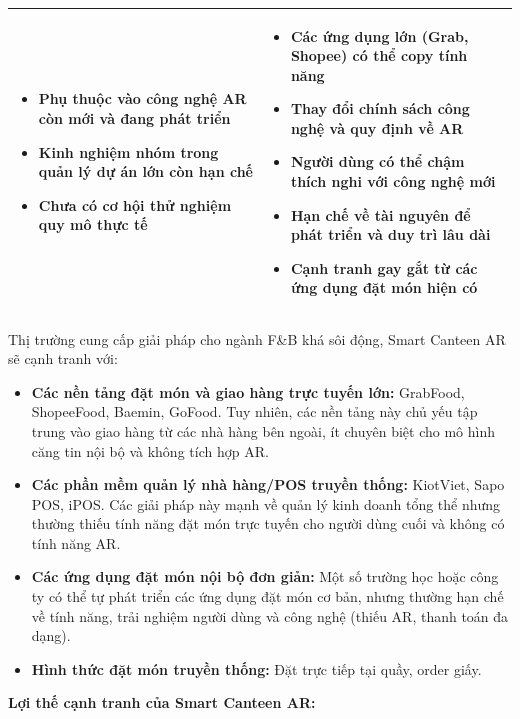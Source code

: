 \documentclass[12pt,a4paper]{article}
\begin{document}
\begin{table}[H]
\begin{tabular}{@{}>{\raggedright\arraybackslash}p{7cm}>{\raggedright\arraybackslash}p{7cm}@{}}
\begin{itemize}[leftmargin=0.4cm,topsep=0pt,itemsep=2pt,parsep=0pt]
    \item Phụ thuộc vào công nghệ AR còn mới và đang phát triển
    \item Kinh nghiệm nhóm trong quản lý dự án lớn còn hạn chế
    \item Chưa có cơ hội thử nghiệm quy mô thực tế
\end{itemize} &
\begin{itemize}[leftmargin=0.4cm,topsep=0pt,itemsep=2pt,parsep=0pt]
    \item Các ứng dụng lớn (Grab, Shopee) có thể copy tính năng
    \item Thay đổi chính sách công nghệ và quy định về AR
    \item Người dùng có thể chậm thích nghi với công nghệ mới
    \item Hạn chế về tài nguyên để phát triển và duy trì lâu dài
    \item Cạnh tranh gay gắt từ các ứng dụng đặt món hiện có
\end{itemize} \\
\bottomrule
\end{tabular}
\end{table}
Thị trường cung cấp giải pháp cho ngành F\&B khá sôi động, Smart Canteen AR sẽ cạnh tranh với:

\begin{itemize}[label=\textbullet]
    \item \textbf{Các nền tảng đặt món và giao hàng trực tuyến lớn:} GrabFood, ShopeeFood, Baemin, GoFood. Tuy nhiên, các nền tảng này chủ yếu tập trung vào giao hàng từ các nhà hàng bên ngoài, ít chuyên biệt cho mô hình căng tin nội bộ và không tích hợp AR.
    \item \textbf{Các phần mềm quản lý nhà hàng/POS truyền thống:} KiotViet, Sapo POS, iPOS. Các giải pháp này mạnh về quản lý kinh doanh tổng thể nhưng thường thiếu tính năng đặt món trực tuyến cho người dùng cuối và không có tính năng AR.
    \item \textbf{Các ứng dụng đặt món nội bộ đơn giản:} Một số trường học hoặc công ty có thể tự phát triển các ứng dụng đặt món cơ bản, nhưng thường hạn chế về tính năng, trải nghiệm người dùng và công nghệ (thiếu AR, thanh toán đa dạng).
    \item \textbf{Hình thức đặt món truyền thống:} Đặt trực tiếp tại quầy, order giấy.
\end{itemize}

\textbf{Lợi thế cạnh tranh của Smart Canteen AR:}
\end{document}
